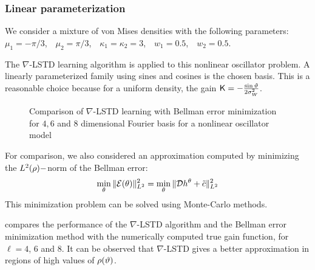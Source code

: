 \subsubsection*{Linear parameterization}
We consider a mixture of von Mises densities with the following parameters: $\mu_1 = -\pi/3$,\ \
$\mu_2 = \pi/3$,\ \
$\kappa_1=\kappa_2=3$,\ \
$w_1 =0.5$,\ \
$w_2 =0.5$.


The $\nabla$-LSTD learning algorithm is applied to this nonlinear oscillator problem. A linearly parameterized family using sines and cosines is the chosen basis. This is a reasonable choice because for a uniform density, the gain $\text{\sf K}=-\frac{\sin \vartheta}{2\sigma_{W}^{2}}$.

\begin{figure}
	\caption{Comparison of $\nabla$-LSTD learning with Bellman error minimization for $4,6$ and $8$ dimensional Fourier basis for a nonlinear oscillator model}
	\label{fig:gain_nl_oscillator}
\end{figure}

For comparison, we also considered an approximation computed by minimizing the $L^2(\rho)-$norm of the Bellman error:
\begin{align}
\min_{\param}\|\clE(\param)\|_{L^2}^{2}= \min_{\param}\|\clD h^\param +\tilc \|_{L^2}^{2}
\label{e:fpf_nl_be}
\end{align}
This minimization problem can be solved using Monte-Carlo methods.

 compares the performance of the $\nabla$-LSTD algorithm and the Bellman error minimization method with the numerically computed true gain function, for $\ell = 4$, $6$ and $8$. It can be observed that $\nabla$-LSTD gives a better approximation in regions of high values of $\rho(\vartheta)$.

